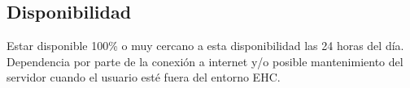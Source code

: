 \subsection{Disponibilidad}
Estar disponible 100\% o muy cercano a esta disponibilidad las 24 horas del d\'ia. Dependencia por parte de la conexi\'on a internet y/o posible mantenimiento del servidor cuando el usuario est\'e fuera del entorno EHC.